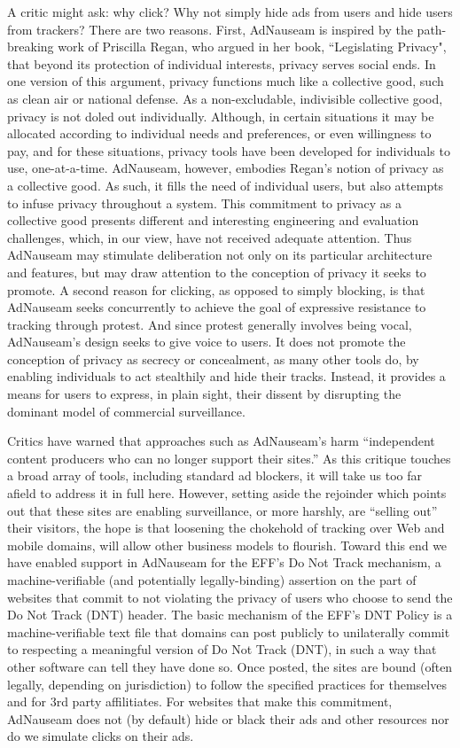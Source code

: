 \documentclass[conference]{IEEEtran}
\begin{document}
A critic might ask: why click? Why not simply hide ads from users and hide users from trackers? There are two reasons. First, AdNauseam is inspired by the path-breaking work of Priscilla Regan, who argued in her book, “Legislating Privacy", that beyond its protection of individual interests, privacy serves social ends\cite{Regan}. In one version of this argument, privacy functions much like a collective good, such as clean air or national defense. As a non-excludable, indivisible collective good, privacy is not doled out individually. Although, in certain situations it may be allocated according to individual needs and preferences, or even willingness to pay, and for these situations, privacy tools have been developed for individuals to use, one-at-a-time. AdNauseam, however, embodies Regan's notion of privacy as a collective good. As such, it fills the need of individual users, but also attempts to infuse privacy throughout a system. This commitment to privacy as a collective good presents different and interesting engineering and evaluation challenges, which, in our view, have not received adequate attention. Thus AdNauseam may stimulate deliberation not only on its particular architecture and features, but may draw attention to the conception of privacy it seeks to promote. A second reason for clicking, as opposed to simply blocking, is that AdNauseam seeks concurrently to achieve the goal of expressive resistance to tracking through protest. And since protest generally involves being vocal, AdNauseam's design seeks to give voice to users. It does not promote the conception of privacy as secrecy or concealment, as many other tools do, by enabling individuals to act stealthily and hide their tracks. Instead, it provides a means for users to express, in plain sight, their dissent by disrupting the dominant model of commercial surveillance.

Critics have warned that approaches such as AdNauseam's harm “independent content producers who can no longer support their sites.” As this critique touches a broad array of tools, including standard ad blockers, it will take us too far afield to address it in full here.  However, setting aside the rejoinder which points out that these sites are enabling surveillance, or more harshly, are “selling out” their visitors, the hope is that loosening the chokehold of tracking over Web and mobile domains, will allow other business models to flourish. Toward this end we have enabled support in AdNauseam for the EFF's Do Not Track mechanism, a machine-verifiable (and potentially legally-binding) assertion on the part of websites that commit to not violating the privacy of users who choose to send the Do Not Track (DNT) header. The basic mechanism of the EFF's DNT Policy is a machine-verifiable text file that domains can post publicly to unilaterally commit to respecting a meaningful version of Do Not Track (DNT), in such a way that other software can tell they have done so. Once posted, the sites are bound (often legally, depending on jurisdiction) to follow the specified practices for themselves and for 3rd party affilitiates. For websites that make this commitment, AdNauseam does not (by default) hide or black their ads and other resources nor do we simulate clicks on their ads.
\end{document}
